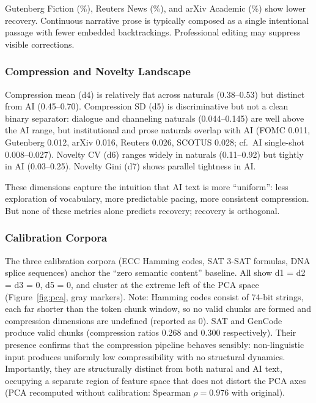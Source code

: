\documentclass[11pt]{article}
\begin{document}
Gutenberg Fiction (\recFiction\%), Reuters News (\recNews\%), and arXiv Academic (\recAcademic\%) show lower recovery. Continuous narrative prose is typically composed as a single intentional passage with fewer embedded backtrackings. Professional editing may suppress visible corrections.

\subsubsection{Compression and Novelty Landscape}

Compression mean (d4) is relatively flat across naturals (0.38--0.53) but distinct from AI (0.45--0.70). Compression SD (d5) is discriminative but not a clean binary separator: dialogue and channeling naturals (0.044--0.145) are well above the AI range, but institutional and prose naturals overlap with AI (FOMC 0.011, Gutenberg 0.012, arXiv 0.016, Reuters 0.026, SCOTUS 0.028; cf.\ AI single-shot 0.008--0.027). Novelty CV (d6) ranges widely in naturals (0.11--0.92) but tightly in AI (0.03--0.25). Novelty Gini (d7) shows parallel tightness in AI.

These dimensions capture the intuition that AI text is more ``uniform'': less exploration of vocabulary, more predictable pacing, more consistent compression. But none of these metrics alone predicts recovery; recovery is orthogonal.

\subsubsection{Calibration Corpora}

The three calibration corpora (ECC Hamming codes, SAT 3-SAT formulas, DNA splice sequences) anchor the ``zero semantic content'' baseline. All show d1 = d2 = d3 = 0, d5 = 0, and cluster at the extreme left of the PCA space (Figure~\ref{fig:pca}, gray markers). Note: Hamming codes consist of 74-bit strings, each far shorter than the \chunkTokens\-token chunk window, so no valid chunks are formed and compression dimensions are undefined (reported as 0). SAT and GenCode produce valid chunks (compression ratios 0.268 and 0.300 respectively). Their presence confirms that the compression pipeline behaves sensibly: non-linguistic input produces uniformly low compressibility with no structural dynamics. Importantly, they are structurally distinct from both natural and AI text, occupying a separate region of feature space that does not distort the PCA axes (PCA recomputed without calibration: Spearman $\rho = 0.976$ with original).
\end{document}
